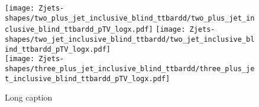 \begin{figure}[!htb]
  \centering
  \texttt{[image: Zjets-shapes/two\_plus\_jet\_inclusive\_blind\_ttbardd/two\_plus\_jet\_inclusive\_blind\_ttbardd\_pTV\_logx.pdf]}
  \texttt{[image: Zjets-shapes/two\_jet\_inclusive\_blind\_ttbardd/two\_jet\_inclusive\_blind\_ttbardd\_pTV\_logx.pdf]} \\
  \texttt{[image: Zjets-shapes/three\_plus\_jet\_inclusive\_blind\_ttbardd/three\_plus\_jet\_inclusive\_blind\_ttbardd\_pTV\_logx.pdf]}
  \caption[Subtracted data versus the nominal Z + jets prediction,
  $p_T^V$.]{Long caption}
  \label{fig:zjets-ptv-shapes}
\end{figure}